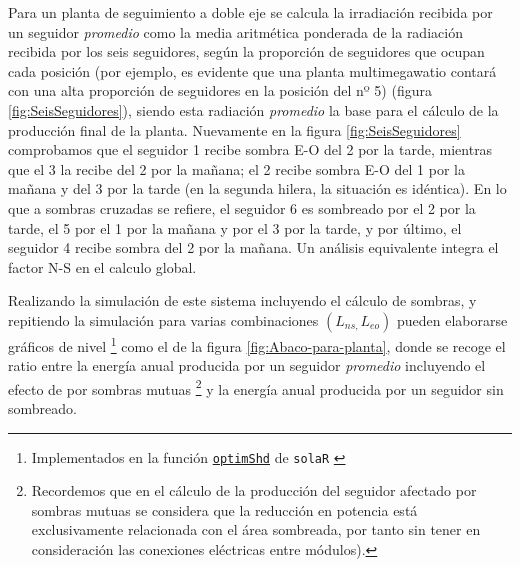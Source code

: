 Para un planta de seguimiento a doble eje se calcula la irradiación 
recibida por un seguidor \emph{promedio} como la media aritmética ponderada 
de la radiación recibida por los seis seguidores, según la proporción 
de seguidores que ocupan cada posición 
(por ejemplo, es evidente que una planta multimegawatio contará con
una alta proporción de seguidores en la posición del nº 5) 
(figura \ref{fig:SeisSeguidores}), siendo esta radiación \emph{promedio}
la base para el cálculo de la producción final de la planta. 
Nuevamente en la figura \ref{fig:SeisSeguidores} comprobamos que 
el seguidor 1 recibe sombra E-O del 2 por la tarde, 
mientras que el 3 la recibe del 2 por la mañana; 
el 2 recibe sombra E-O del 1 por la mañana y 
del 3 por la tarde (en la segunda hilera, la situación es idéntica). 
En lo que a sombras cruzadas se refiere, 
el seguidor 6 es sombreado por el 2 por la tarde, 
el 5 por el 1 por la mañana y por el 3 por la tarde, 
y por último, el seguidor 4 recibe sombra del 2 por la mañana. 
Un análisis equivalente integra el factor N-S en el calculo global.

Realizando la simulación de este sistema incluyendo el cálculo de
sombras, y repitiendo la simulación para varias combinaciones $(L_{ns,}L_{eo})$
pueden elaborarse gráficos de nivel%
\footnote{Implementados en la función
  \href{http://search.r-project.org/R/library/solaR/html/optimShd.html}{\texttt{optimShd}}
  de \texttt{solaR} \cite{Perpinan2012b}}%
 como el de la figura
\ref{fig:Abaco-para-planta}, donde se recoge el ratio entre
la energía anual producida por un seguidor \emph{promedio} incluyendo
el efecto de por sombras mutuas
\footnote{Recordemos
que en el cálculo de la producción del seguidor afectado por sombras
mutuas se considera que la reducción en potencia
está exclusivamente relacionada con el área sombreada, por tanto sin tener en
consideración las conexiones eléctricas entre módulos).}
y la energía anual producida por un seguidor sin sombreado. 

